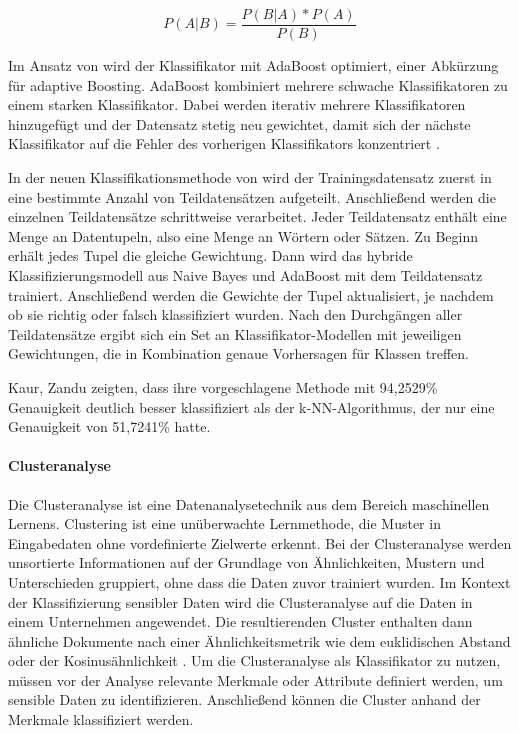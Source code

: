 \begin{equation}
    \label{e:naive-bayes}
    P(A|B) = \frac{P(B|A) * P(A)}{P(B)}
\end{equation}

Im Ansatz von \cite{Kaur.2016} wird der Klassifikator mit AdaBoost optimiert, einer Abkürzung für adaptive Boosting. AdaBoost kombiniert mehrere schwache Klassifikatoren zu einem starken Klassifikator. Dabei werden iterativ mehrere Klassifikatoren hinzugefügt und der Datensatz stetig neu gewichtet, damit sich der nächste Klassifikator auf die Fehler des vorherigen Klassifikators konzentriert \cite{Frochte.2018c}.

In der neuen Klassifikationsmethode von \cite{Kaur.2016} wird der Trainingsdatensatz zuerst in eine bestimmte Anzahl von Teildatensätzen aufgeteilt. Anschließend werden die einzelnen Teildatensätze schrittweise verarbeitet. Jeder Teildatensatz enthält eine Menge an Datentupeln, also eine Menge an Wörtern oder Sätzen. Zu Beginn erhält jedes Tupel die gleiche Gewichtung. Dann wird das hybride Klassifizierungsmodell aus Naive Bayes und AdaBoost mit dem Teildatensatz trainiert. Anschließend werden die Gewichte der Tupel aktualisiert, je nachdem ob sie richtig oder falsch klassifiziert wurden. Nach den Durchgängen aller Teildatensätze ergibt sich ein Set an Klassifikator-Modellen mit jeweiligen Gewichtungen, die in Kombination genaue Vorhersagen für Klassen treffen.

Kaur, Zandu \cite{Kaur.2016} zeigten, dass ihre vorgeschlagene Methode mit 94,2529\% Genauigkeit deutlich besser klassifiziert als der k-NN-Algorithmus, der nur eine Genauigkeit von 51,7241\% hatte.

\paragraph{Clusteranalyse}
Die Clusteranalyse ist eine Datenanalysetechnik aus dem Bereich maschinellen Lernens. Clustering ist eine unüberwachte Lernmethode, die Muster in Eingabedaten ohne vordefinierte Zielwerte erkennt. Bei der Clusteranalyse werden unsortierte Informationen auf der Grundlage von Ähnlichkeiten, Mustern und Unterschieden gruppiert, ohne dass die Daten zuvor trainiert wurden. Im Kontext der Klassifizierung sensibler Daten wird die Clusteranalyse auf die Daten in einem Unternehmen angewendet. Die resultierenden Cluster enthalten dann ähnliche Dokumente nach einer Ähnlichkeitsmetrik wie dem euklidischen Abstand oder der Kosinusähnlichkeit \cite{Suyal.2014}.
Um die Clusteranalyse als Klassifikator zu nutzen, müssen vor der Analyse relevante Merkmale oder Attribute definiert werden, um sensible Daten zu identifizieren. Anschließend können die Cluster anhand der Merkmale klassifiziert werden.

